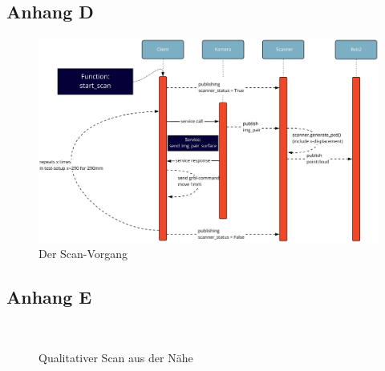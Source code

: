 \documentclass[	12pt,
				a4paper,
				bibliography=totoc,
				listof=totoc,
				index=totoc,
				twoside,
				headsepline,
				footsepline,
				ngerman]{scrartcl}
\begin{document}
\begin{appendix}
		\subsection{Anhang D}\label{anhang-d}
			\begin{figure}[h!]
				\centering
				\includegraphics[width=1\linewidth]{img/anhang/vorgang_scanablauf.jpg}
				\caption{Der Scan-Vorgang}
				\label{fig:vorgang_scan}
			\end{figure}
		\newpage
		\subsection{Anhang E}\label{anhang-e}
			\begin{figure}[h]
				\centering
				 \\
				\caption{Qualitativer Scan aus der Nähe}
				\label{fig:scan_lines}
			\end{figure}
		\newpage

\end{appendix}
\end{document}
